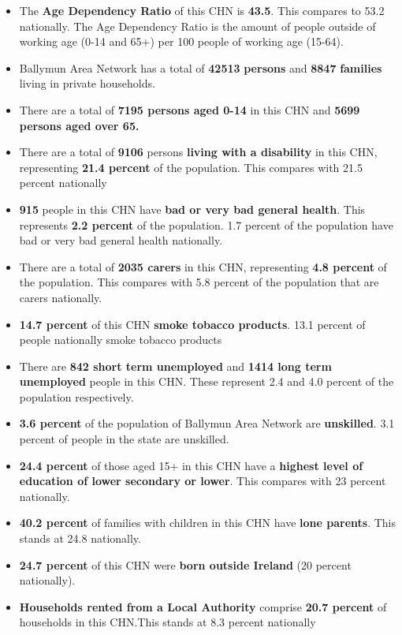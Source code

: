 \documentclass{article}
\begin{document}
\begin{itemize}

\item The \textbf{Age Dependency Ratio} of this CHN is  \textbf{43.5}. This compares to 53.2 nationally. The Age Dependency Ratio is the amount of people outside of working age (0-14 and 65+) per 100 people of working age (15-64). 

\item Ballymun Area Network has a total of \textbf{\num{42513}} \textbf{persons} and  \textbf{\num{8847}} \textbf{families} living in private households.

\item There are a total of \textbf{\num{7195} persons aged 0-14} in this CHN and \textbf{\num{5699} persons aged over 65.} 

\item There are a total of \textbf{\num{9106}} persons \textbf{living with a disability} in this CHN, representing \textbf{21.4 percent} of the population. This compares with  21.5 percent nationally

\item \textbf{\num{915}} people in this CHN have \textbf{bad or very bad general health}. This represents \textbf{2.2 percent} of the population. 1.7 percent of the population have bad or very bad general health nationally. 

\item There are a total of \textbf{\num{2035} carers} in this CHN, representing \textbf{4.8 percent} of the population. This compares with 5.8 percent of the population that are carers nationally. 

\item \textbf{14.7 percent} of this CHN \textbf{smoke tobacco products}. 13.1 percent of people nationally smoke tobacco products

\item There are \textbf{\num{842} short term unemployed} and \textbf{\num{1414} long term unemployed} people in this CHN. These represent 2.4 and 4.0 percent of the population respectively.

\item  \textbf{3.6 percent} of the population of Ballymun Area Network are \textbf{unskilled}. 3.1 percent of people in the state are unskilled.

\item \textbf{24.4 percent} of those aged 15+ in this CHN have a \textbf{highest level of education of lower secondary or lower}. This compares with 23 percent nationally. 

\item \textbf{40.2 percent} of families with children in this CHN have \textbf{lone parents}. This stands at 24.8 nationally.

\item \textbf{24.7 percent} of this CHN were \textbf{born outside Ireland} (20 percent nationally).

\item \textbf{Households rented from a Local Authority} comprise \textbf{20.7 percent} of households in this CHN.This stands at 8.3 percent nationally

\end{itemize}
\end{document}
